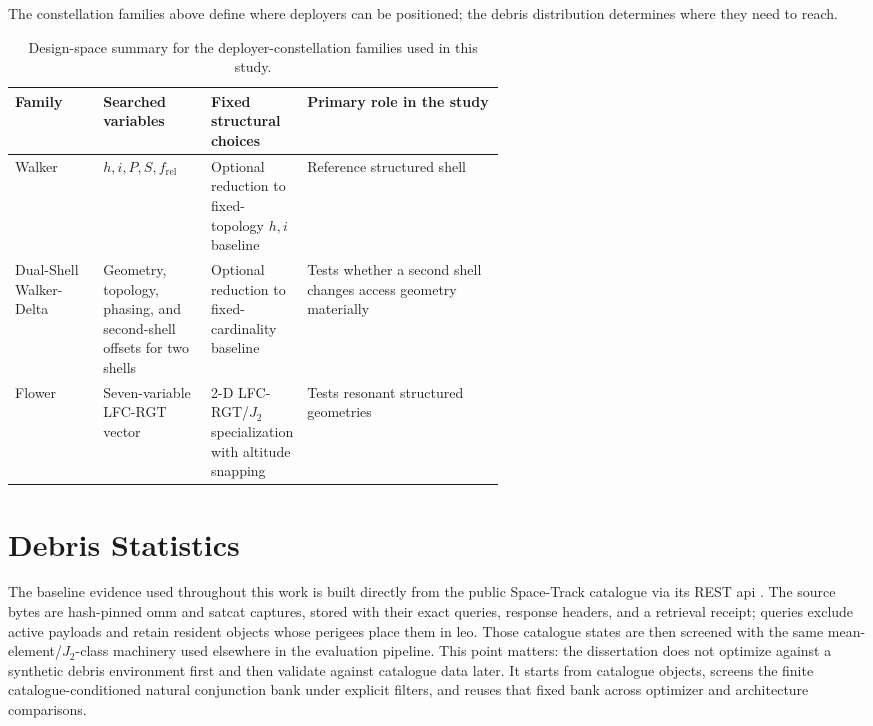     \clearpage
    The constellation families above define where deployers can be positioned; the debris distribution determines where they need to reach.

    \begin{table}[htb]
        \centering
        \caption[Constellation design-space summary]{Design-space summary for the deployer-constellation families used in this study.}
        \label{tab:constellation_design_space_summary}
        \begin{tabularx}{0.94\linewidth}{@{}L{0.18\linewidth}L{0.22\linewidth}L{0.17\linewidth}Y@{}}
            \toprule
            Family & Searched variables & Fixed structural choices & Primary role in the study \\
            \midrule
            Walker & \(h,i,P,S,f_{\mathrm{rel}}\) & Optional reduction to fixed-topology \(h,i\) baseline & Reference structured shell \\
            Dual-Shell Walker-Delta & Geometry, topology, phasing, and second-shell offsets for two shells & Optional reduction to fixed-cardinality baseline & Tests whether a second shell changes access geometry materially \\
            Flower & Seven-variable LFC-RGT vector & 2-D LFC-RGT/\(J_2\) specialization with altitude snapping & Tests resonant structured geometries \\
            \bottomrule
        \end{tabularx}
    \end{table}

\section{Debris Statistics} \label{se:debrisstats}
    The baseline evidence used throughout this work is built directly from the public Space-Track catalogue via its REST \gls{api} \cite{spacetrack}. The source bytes are hash-pinned \gls{omm} and \gls{satcat} captures, stored with their exact queries, response headers, and a retrieval receipt; queries exclude active payloads and retain resident objects whose perigees place them in \gls{leo}. Those catalogue states are then screened with the same mean-element/\(J_2\)-class machinery used elsewhere in the evaluation pipeline. This point matters: the dissertation does not optimize against a synthetic debris environment first and then validate against catalogue data later. It starts from catalogue objects, screens the finite catalogue-conditioned natural conjunction bank under explicit filters, and reuses that fixed bank across optimizer and architecture comparisons.

